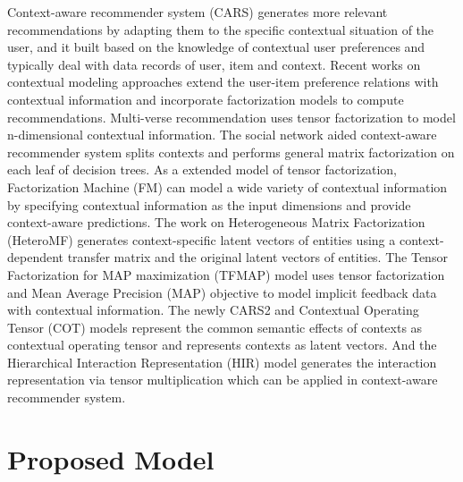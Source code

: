 \documentclass{sig-alternate}
\begin{document}
Context-aware recommender system (CARS) \cite{adomavicius2011context} generates more relevant recommendations by adapting them to the specific contextual situation of the user, and it built based on the knowledge of contextual user preferences and typically deal with data records of user, item and context. Recent works on contextual modeling approaches extend the user-item preference relations with contextual information and incorporate factorization models to compute recommendations. Multi-verse recommendation \cite{karatzoglou2010multiverse} uses tensor factorization to model n-dimensional contextual information. The social network aided context-aware recommender system \cite{liu2013soco} splits contexts and performs general matrix factorization on each leaf of decision trees. As a extended model of tensor factorization, Factorization Machine (FM) \cite{rendle2011fast} can model a wide variety of contextual information by specifying contextual information as the input dimensions and provide context-aware predictions. The work on Heterogeneous Matrix Factorization (HeteroMF) \cite{jamali2013heteromf} generates context-specific latent vectors of entities using a context-dependent transfer matrix and the original latent vectors of entities. The Tensor Factorization for MAP maximization (TFMAP) model \cite{shi2012tfmap} uses tensor factorization and Mean Average Precision (MAP) objective to model implicit feedback data with contextual information. The newly CARS2 \cite{shi2014cars} and Contextual Operating Tensor (COT) \cite{liu2015cot} models represent the common semantic effects of contexts as contextual operating tensor and represents contexts as latent vectors. And the Hierarchical Interaction Representation (HIR) model \cite{liu2015collaborative} generates the interaction representation via tensor multiplication which can be applied in context-aware recommender system.

\section{Proposed Model}

\end{document}
